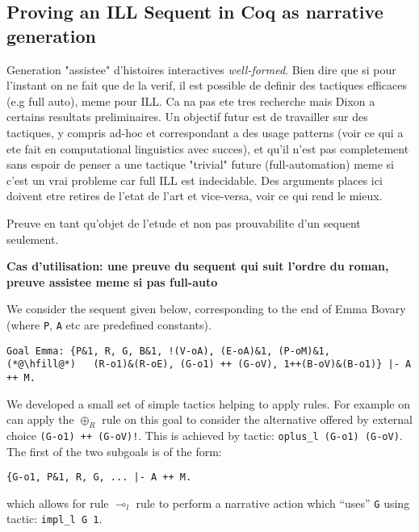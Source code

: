 \documentclass[runningheads,a4paper]{llncs}
\begin{document}
\subsection{Proving an ILL Sequent in Coq as narrative generation}
Generation "assistee" d'histoires interactives \emph{well-formed}. Bien dire que si pour l'instant on ne fait que de la verif, il est possible de definir des tactiques efficaces (e.g full auto), meme pour ILL. Ca na pas ete tres recherche mais Dixon a certains resultats preliminaires. Un objectif futur est de travailler sur des tactiques, y compris ad-hoc et correspondant a des usage patterns (voir ce qui a ete fait en computational linguistics avec succes), et qu'il n'est pas completement sans espoir de penser a une tactique "trivial" future (full-automation) meme si c'est un vrai probleme car full ILL est indecidable. Des arguments places ici doivent etre retires de l'etat de l'art et vice-versa, voir ce qui rend le mieux.

Preuve en tant qu'objet de l'etude et non pas prouvabilite d'un sequent seulement.

\textbf{Cas d'utilisation: une preuve du sequent qui suit l'ordre du roman, preuve assistee meme si pas full-auto}

We consider the sequent given below, corresponding to the end of Emma
Bovary (where \texttt{P}, \texttt{A} etc are predefined constants). 
\begin{lstlisting}[language=Coq]
Goal Emma: {P&1, R, G, B&1, !(V-oA), (E-oA)&1, (P-oM)&1,
(*@\hfill@*)   (R-o1)&(R-oE), (G-o1) ++ (G-oV), 1++(B-oV)&(B-o1)} |- A ++ M.
\end{lstlisting}
We developed a small set of simple tactics helping to apply rules. For
example on can apply the $\oplus_R$ rule on this goal to consider the
alternative offered by external choice \lstinline|(G-o1) ++ (G-oV)!|.
This is achieved by tactic: \lstinline|oplus_l (G-o1) (G-oV)|. The
first of the two subgoals is of the form: 
\begin{lstlisting}
{G-o1, P&1, R, G, ... |- A ++ M.
\end{lstlisting}
which allows for rule $\multimap_l$ rule to perform a narrative action
which ``uses'' \lstinline|G| using tactic: \lstinline|impl_l G 1|.
\end{document}
